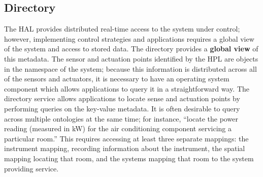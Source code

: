 

\subsection{Directory}


The HAL provides distributed real-time access to the system under control; however, implementing control strategies and applications requires a global view of the system and access to stored data.  The directory provides a {\bf global view} of this metadata.
%
The sensor and actuation points identified by the HPL are objects in the namespace of the system; because this information is distributed across all of the sensors and actuators, it is necessary to have an operating system component which allows applications to query it in a straightforward way.
%
The directory service allows applications to locate sense and actuation points by performing queries on the key-value metadata.  It is often desirable to query across multiple ontologies at the same time; for instance, ``locate the power reading (measured in kW) for the air conditioning component servicing a particular room.''  This requires accessing at least three separate mappings: the instrument mapping, recording information about the instrument, the spatial mapping locating that room, and the systems mapping that room to the system providing service.

